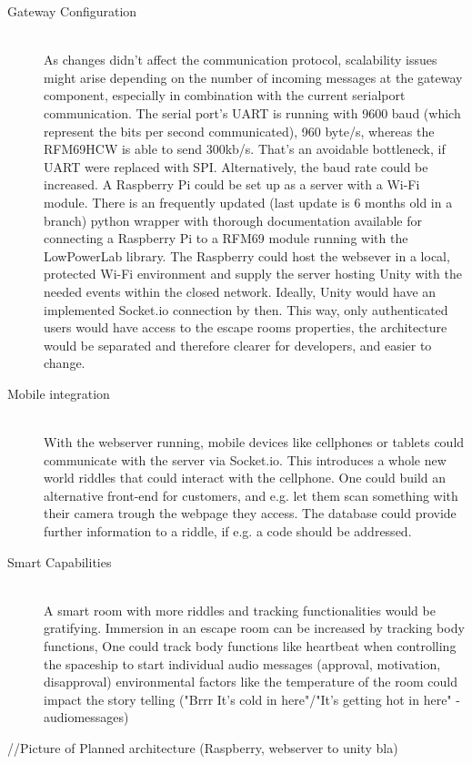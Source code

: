 \begin{description}
    \item[Gateway Configuration]\hfill \\
    As changes didn't affect the communication protocol, scalability issues might arise depending on the number of incoming messages at the gateway component, 
    especially in combination with the current serialport communication. 
    The serial port's UART is running with 9600 baud (which represent the bits per second communicated), 
    960 byte/s, whereas the RFM69HCW is able to send 300kb/s. 
    That's an avoidable bottleneck, if UART were replaced with SPI.
    Alternatively, the baud rate could be increased.
    A Raspberry Pi could be set up as a server with a Wi-Fi module. 
    There is an frequently updated (last update is 6 months old in a branch) python wrapper \parencite{raspberrypiLibRFM} with thorough documentation \parencite{raspberrypiDoc} available for connecting 
    a Raspberry Pi to a RFM69 module running with the LowPowerLab library. 
    The Raspberry could host the websever in a local, protected Wi-Fi environment and 
    supply the server hosting Unity with the needed events within the closed network. 
    Ideally, Unity would have an implemented Socket.io connection by then.
    This way, only authenticated users would have access to the escape rooms properties, 
    the architecture would be separated and therefore clearer for developers, and easier to change.
     \parencite{raspberrypiDoc}
     \item[Mobile integration]\hfill \\
     With the webserver running, mobile devices like cellphones or tablets could communicate with the server via Socket.io. 
     This introduces a whole new world riddles that could interact with the cellphone. 
     One could build an alternative front-end for customers, and e.g.
     let them scan something with their camera trough the webpage they access.
     The database could provide further information to a riddle, if e.g. a code should be addressed.
     \item[Smart Capabilities]\hfill \\
     A smart room with more riddles and tracking functionalities would be gratifying.
     Immersion in an escape room can be increased by tracking body functions,
     One could track body functions like heartbeat when controlling 
     the spaceship to start individual audio messages (approval, motivation, disapproval)
     environmental factors like the temperature of the room could impact the story telling ("Brrr It's cold in here"/"It's getting hot in here" - audiomessages)
\end{description}
//Picture of Planned architecture (Raspberry, webserver to unity bla)

